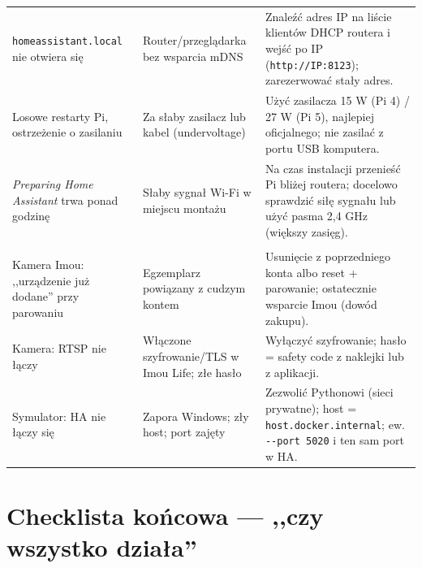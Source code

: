 \documentclass[11pt,a4paper]{article}
\begin{document}
\begin{longtable}{>{\raggedright\arraybackslash}p{4.2cm} >{\raggedright\arraybackslash}p{4.6cm} >{\raggedright\arraybackslash}p{5.6cm}}
\addlinespace
\texttt{homeassistant.\allowbreak local} nie otwiera się & Router/przeglądarka bez wsparcia mDNS & Znaleźć adres IP na liście klientów DHCP routera i wejść po IP (\texttt{http://IP:8123}); zarezerwować stały adres.\\
\addlinespace
Losowe restarty Pi, ostrzeżenie o zasilaniu & Za słaby zasilacz lub kabel (undervoltage) & Użyć zasilacza 15 W (Pi 4) / 27 W (Pi 5), najlepiej oficjalnego; nie zasilać z portu USB komputera.\\
\addlinespace
\emph{Preparing Home Assistant} trwa ponad godzinę & Słaby sygnał Wi-Fi w miejscu montażu & Na czas instalacji przenieść Pi bliżej routera; docelowo sprawdzić siłę sygnału lub użyć pasma 2,4 GHz (większy zasięg).\\
\addlinespace
\multicolumn{3}{l}{\textit{--- Rozszerzenia ---}}\\
\addlinespace
Kamera Imou: ,,urządzenie już dodane'' przy parowaniu & Egzemplarz powiązany z cudzym kontem & Usunięcie z poprzedniego konta albo reset + parowanie; ostatecznie wsparcie Imou (dowód zakupu).\\
\addlinespace
Kamera: RTSP nie łączy & Włączone szyfrowanie/TLS w Imou Life; złe hasło & Wyłączyć szyfrowanie; hasło = safety code z naklejki lub z aplikacji.\\
\addlinespace
Symulator: HA nie łączy się & Zapora Windows; zły host; port zajęty & Zezwolić Pythonowi (sieci prywatne); host = \texttt{host.docker.internal}; ew. \texttt{-{}-port 5020} i ten sam port w HA.\\
\bottomrule
\end{longtable}

\section{Checklista końcowa --- ,,czy wszystko działa''}
\end{document}
